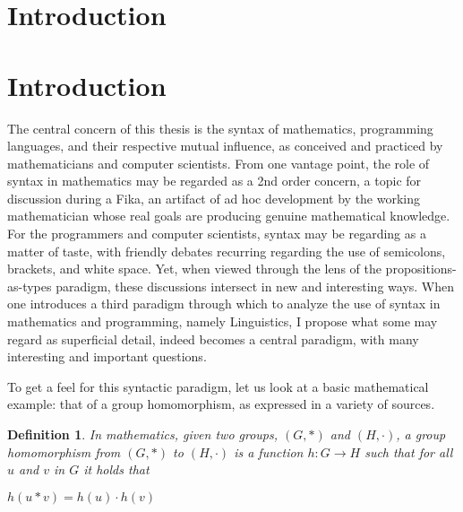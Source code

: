 \documentclass[11pt, a4paper]{article}
\newtheorem{definition}{Definition}
\begin{document}
\newpage

\begin{spacing}{0.0}
\tableofcontents
\end{spacing}

\thispagestyle{empty}

\newpage
\setcounter{page}{1}

\section{Introduction}
\label{sec:intro}

\section{Introduction}

The central concern of this thesis is the syntax of mathematics, programming
languages, and their respective mutual influence, as conceived and practiced by
mathematicians and computer scientists.  From one vantage point, the role of
syntax in mathematics may be regarded as a 2nd order concern, a topic for
discussion during a Fika, an artifact of ad hoc development by the working
mathematician whose real goals are producing genuine mathematical knowledge.
For the programmers and computer scientists, syntax may be regarding as a
matter of taste, with friendly debates recurring regarding the use of
semicolons, brackets, and white space.  Yet, when viewed through the lens of
the propositions-as-types paradigm, these discussions intersect in new and
interesting ways.  When one introduces a third paradigm through which to
analyze the use of syntax in mathematics and programming, namely Linguistics, I
propose what some may regard as superficial detail, indeed becomes a central
paradigm, with many interesting and important questions. 

To get a feel for this syntactic paradigm, let us look at a basic mathematical
example: that of a group homomorphism, as expressed in a variety of sources.  


\begin{definition}
In mathematics, given two groups, $(G, \ast)$ and $(H, \cdot)$, a group homomorphism from $(G, \ast)$ to $(H, \cdot)$ is a function $h : G \to H$ such that for all $u$ and $v$ in $G$ it holds that

\begin{center}
  $h(u \ast v) = h ( u ) \cdot h ( v )$ 
\end{center}
\end{definition}
\end{document}
